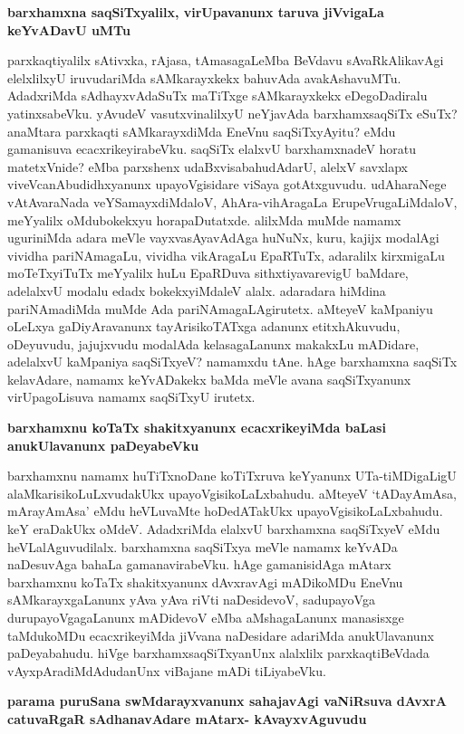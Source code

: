 {\medskip
\noindent
{\large\bf barxhamxna saqSiTxyalilx, virUpavanunx taruva jiVvigaLa keYvADavU uMTu}}\label{page192}
\medskip

\noindent
parxkaqtiyalilx sAtivxka, rAjasa, tAmasagaLeMba BeVdavu sAvaRkAlikavAgi elelx\-lilxyU iruvuda\-riMda sAMkarayxkekx bahuvAda avakAshavuMTu. AdadxriMda sAdhayxvAdaSuTx maTiTxge sAMkarayxkekx eDegoDadiralu yatinxsabeVku. yAvudeV vasutxvinalilxyU neYjavAda barxhamxsaqSiTx eSuTx? anaMtara parxkaqti sAMkarayxdiMda EneVnu saqSiTxyAyitu? eMdu gamanisuva ecacxrikeyirabeVku. saqSiTx elalxvU barxhamxnadeV horatu matetxVnide? eMba parxshenx udaBxvisabahudAdarU, alelxV savxlapx viveVcanAbudidhxyanunx upayoVgisidare viSaya gotAtxguvudu. udAharaNege vAtAvaraNada veYSamayxdiMdaloV, AhAra-vihAragaLa Eru\-peVrugaLiMdaloV, meYyalilx oMdubokekxyu horapaDutatxde. alilxMda muMde namamx uguriniMda adara meVle vayxvasAyavAdAga huNuNx, kuru, kajijx modalAgi vividha pariNAmagaLu, vividha vikAragaLu EpaRTuTx, adaralilx kirxmigaLu moTeTxyiTuTx meYyalilx huLu EpaRDuva sithxtiyavarevigU baMdare, ade\-lalxvU modalu edadx bokekxyiMdaleV alalx. adaradara hiMdina pariNAmadiMda muMde Ada pariNAma\-gaLAgirutetx. aMteyeV kaMpaniyu oLeLxya gaDiyAravanunx tayArisikoTATxga adanunx etitxhAkuvudu, oDeyuvudu, jajujxvudu modalAda kelasagaLanunx makakxLu mADidare, adelalxvU kaMpaniya saqSiTxyeV? namamxdu tAne. hAge \-barxhamxna saqSiTx kelavAdare, namamx keYvADakekx baMda meVle avana saqSiTxyanunx virUpagoLisuva namamx saqSiTxyU irutetx.

{\bigskip
\noindent
{\large\bf barxhamxnu koTaTx shakitxyanunx ecacxrikeyiMda baLasi anukUlavanunx paDeyabeVku}}\label{page193}
\smallskip

\noindent
barxhamxnu namamx huTiTxnoDane koTiTxruva keYyanunx UTa-tiMDigaLigU alaM\-karisikoLuLxvudakUkx upa\-yoVgisikoLaLxbahudu. aMteyeV `tADayAmAsa, mArayAmAsa' eMdu heVLuvaMte hoDedATakUkx upayoVgisikoLaLxba\-hudu. keY eraDakUkx oMdeV. AdadxriMda elalxvU barxhamxna saqSiTxyeV eMdu heVLalAguvudilalx. barxhamxna saqSiTxya meVle namamx keYvADa naDesuvAga bahaLa gamanavirabeVku. hAge gamanisidAga mAtarx barxhamxnu koTaTx\- shakitxyanunx dAvxravAgi mADikoMDu EneVnu sAMkarayxgaLanunx yAva yAva riVti naDesidevoV, sadupayoVga durupayoVgagaLanunx mADidevoV eMba aMshagaLanunx manasisxge taMdukoMDu ecacxrike\-yiMda jiVvana naDesidare adariMda anukUlavanunx paDeyabahudu. hiVge barxhamxsaqSiTxyanUnx alalxlilx parxkaqtiBeVdada vAyxpAra\-diMdAdudanUnx viBajane mADi tiLiyabeVku.

{\bigskip
\noindent
{\large\bf parama puruSana swMdarayxvanunx sahajavAgi vaNiRsuva dAvxrA catuvaRgaR sAdhanavAdare mAtarx- kAvayxvAguvudu}}\label{page193}
\medskip

